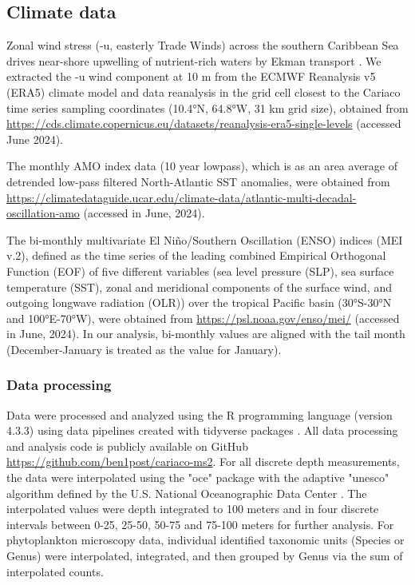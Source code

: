 \documentclass[draft]{agujournal2019}
\begin{document}
\subsection{Climate data}
    Zonal wind stress (-u, easterly Trade Winds) across the southern Caribbean Sea drives near-shore upwelling of nutrient-rich waters by Ekman transport \cite{taylor_ecosystem_2012}. We extracted the -u wind component at 10 m from the ECMWF Reanalysis v5 (ERA5) climate model and data reanalysis in the grid cell closest to the Cariaco time series sampling coordinates (\ang{10.4}N, \ang{64.8}W, 31 km grid size), obtained from \url{https://cds.climate.copernicus.eu/datasets/reanalysis-era5-single-levels} (accessed June 2024).
    
    The monthly AMO index data (10 year lowpass), which is as an area average of detrended low-pass filtered North-Atlantic SST anomalies, were obtained from \url{https://climatedataguide.ucar.edu/climate-data/atlantic-multi-decadal-oscillation-amo} (accessed in June, 2024).
    
    The bi-monthly multivariate El Niño/Southern Oscillation (ENSO) indices (MEI v.2), defined as the time series of the leading combined Empirical Orthogonal Function (EOF) of five different variables (sea level pressure (SLP), sea surface temperature (SST), zonal and meridional components of the surface wind, and outgoing longwave radiation (OLR)) over the tropical Pacific basin (\ang{30}S-\ang{30}N and \ang{100}E-\ang{70}W), were obtained from \url{https://psl.noaa.gov/enso/mei/} (accessed in June, 2024). In our analysis, bi-monthly values are aligned with the tail month (December-January is treated as the value for January).
    

    \subsubsection{Data processing}
    Data were processed and analyzed using the R programming language (version 4.3.3) \cite{r_core_team_r_2024} using data pipelines created with tidyverse packages \cite{wickham_welcome_2019}. All data processing and analysis code is publicly available on GitHub \url{https://github.com/ben1post/cariaco-ms2}. %
    For all discrete depth measurements, the data were interpolated using the "oce" package \cite{kelley_oce_2023} with the adaptive "unesco" algorithm defined by the U.S. National Oceanographic Data Center \cite{johnson2006world}. The interpolated values were depth integrated to 100 meters and in four discrete intervals between 0-25, 25-50, 50-75 and 75-100 meters for further analysis. For phytoplankton microscopy data, individual identified taxonomic units (Species or Genus) were interpolated, integrated, and then grouped by Genus via the sum of interpolated counts.
\end{document}
